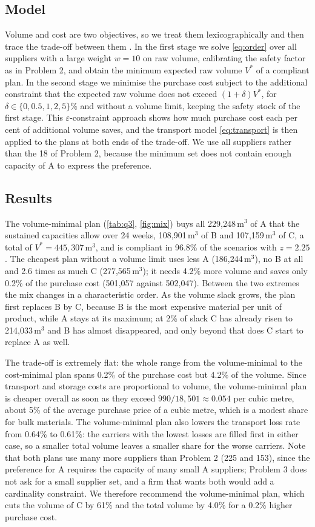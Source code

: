 \documentclass[11pt,a4paper]{article}
\begin{document}
\subsection{Model}
Volume and cost are two objectives, so we treat them lexicographically and then trace the trade-off between them \citep{ehrgott2005}.
In the first stage we solve \cref{eq:order} over all suppliers with a large weight $w=10$ on raw volume, calibrating the safety factor as in Problem 2, and obtain the minimum expected raw volume $V^*$ of a compliant plan.
In the second stage we minimise the purchase cost subject to the additional constraint that the expected raw volume does not exceed $(1+\delta)V^*$, for $\delta\in\{0,0.5,1,2,5\}\%$ and without a volume limit, keeping the safety stock of the first stage.
This $\varepsilon$-constraint approach shows how much purchase cost each per cent of additional volume saves, and the transport model \cref{eq:transport} is then applied to the plans at both ends of the trade-off.
We use all suppliers rather than the 18 of Problem 2, because the minimum set does not contain enough capacity of A to express the preference.

\subsection{Results}
The volume-minimal plan (\cref{tab:q3}, \cref{fig:mix}) buys all 229{,}248\,m$^3$ of A that the sustained capacities allow over 24 weeks, 108{,}901\,m$^3$ of B and 107{,}159\,m$^3$ of C, a total of $V^*=445{,}307$\,m$^3$, and is compliant in 96.8\% of the scenarios with $z=2.25$.
The cheapest plan without a volume limit uses less A (186{,}244\,m$^3$), no B at all and 2.6 times as much C (277{,}565\,m$^3$); it needs 4.2\% more volume and saves only 0.2\% of the purchase cost (501{,}057 against 502{,}047).
Between the two extremes the mix changes in a characteristic order.
As the volume slack grows, the plan first replaces B by C, because B is the most expensive material per unit of product, while A stays at its maximum; at 2\% of slack C has already risen to 214{,}033\,m$^3$ and B has almost disappeared, and only beyond that does C start to replace A as well.

The trade-off is extremely flat: the whole range from the volume-minimal to the cost-minimal plan spans 0.2\% of the purchase cost but 4.2\% of the volume.
Since transport and storage costs are proportional to volume, the volume-minimal plan is cheaper overall as soon as they exceed $990/18{,}501\approx0.054$ per cubic metre, about 5\% of the average purchase price of a cubic metre, which is a modest share for bulk materials.
The volume-minimal plan also lowers the transport loss rate from 0.64\% to 0.61\%: the carriers with the lowest losses are filled first in either case, so a smaller total volume leaves a smaller share for the worse carriers.
Note that both plans use many more suppliers than Problem 2 (225 and 153), since the preference for A requires the capacity of many small A suppliers; Problem 3 does not ask for a small supplier set, and a firm that wants both would add a cardinality constraint.
We therefore recommend the volume-minimal plan, which cuts the volume of C by 61\% and the total volume by 4.0\% for a 0.2\% higher purchase cost.
\end{document}
